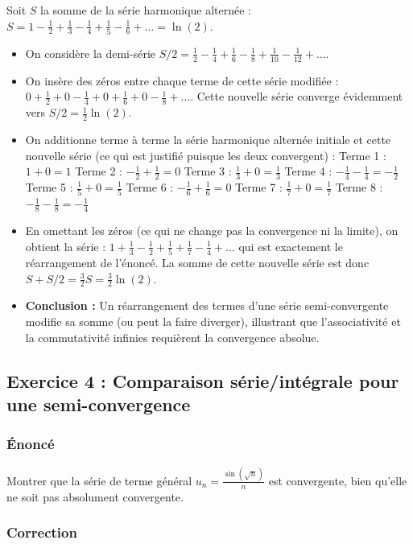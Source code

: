 \documentclass[12pt,a4paper]{report}
\begin{document}
Soit $S$ la somme de la série harmonique alternée : $S = 1 - \frac{1}{2} + \frac{1}{3} - \frac{1}{4} + \frac{1}{5} - \frac{1}{6} + \dots = \ln(2)$.
\begin{itemize}
\item On considère la demi-série $S/2 = \frac{1}{2} - \frac{1}{4} + \frac{1}{6} - \frac{1}{8} + \frac{1}{10} - \frac{1}{12} + \dots$.
\item On insère des zéros entre chaque terme de cette série modifiée : $0 + \frac{1}{2} + 0 - \frac{1}{4} + 0 + \frac{1}{6} + 0 - \frac{1}{8} + \dots$.
Cette nouvelle série converge évidemment vers $S/2 = \frac{1}{2}\ln(2)$.
\item On additionne terme à terme la série harmonique alternée initiale et cette nouvelle série (ce qui est justifié puisque les deux convergent) :
   Terme 1 : $1 + 0 = 1$
   Terme 2 : $-\frac{1}{2} + \frac{1}{2} = 0$
   Terme 3 : $\frac{1}{3} + 0 = \frac{1}{3}$
   Terme 4 : $-\frac{1}{4} - \frac{1}{4} = -\frac{1}{2}$
   Terme 5 : $\frac{1}{5} + 0 = \frac{1}{5}$
   Terme 6 : $-\frac{1}{6} + \frac{1}{6} = 0$
   Terme 7 : $\frac{1}{7} + 0 = \frac{1}{7}$
   Terme 8 : $-\frac{1}{8} - \frac{1}{8} = -\frac{1}{4}$
\item En omettant les zéros (ce qui ne change pas la convergence ni la limite), on obtient la série :
   $1 + \frac{1}{3} - \frac{1}{2} + \frac{1}{5} + \frac{1}{7} - \frac{1}{4} + \dots$
   qui est exactement le réarrangement de l'énoncé. La somme de cette nouvelle série est donc $S + S/2 = \frac{3}{2}S = \frac{3}{2}\ln(2)$.
\item \textbf{Conclusion :} Un réarrangement des termes d'une série semi-convergente modifie sa somme (ou peut la faire diverger), illustrant que l'associativité et la commutativité infinies requièrent la convergence absolue.
\end{itemize}


\subsection{Exercice 4 : Comparaison série/intégrale pour une semi-convergence}

\subsubsection{Énoncé}
Montrer que la série de terme général $u_n = \frac{\sin(\sqrt{n})}{n}$ est convergente, bien qu'elle ne soit pas absolument convergente.

\subsubsection{Correction}
\end{document}
